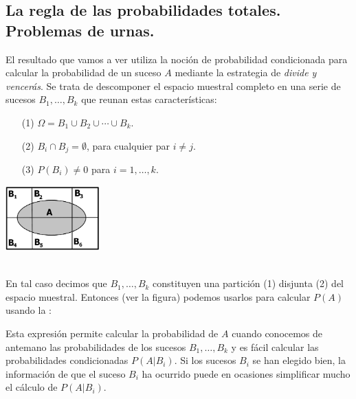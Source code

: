 \subsection{La regla de las probabilidades totales. Problemas de urnas.}
\label{cap03:subsec:ProbabilidadesTotales}


El resultado que vamos a ver utiliza la noción de probabilidad condicionada para calcular la probabilidad de un suceso $A$ mediante la estrategia de {\em divide y vencerás}.  Se trata de descomponer el espacio muestral completo en una serie de sucesos $B_1,\ldots,B_k$ que reunan estas características:\\[3mm]
\begin{minipage}{6.5cm}
    \begin{enumerate}
    	\item[(1)] $\Omega=B_1\cup B_2\cup\cdots\cup B_k.$
    	\item[(2)] $B_i\cap B_j=\emptyset$, para cualquier par $i\neq j$.
    	\item[(3)] $P(B_i)\neq 0$ para $i=1,\ldots,k$.
    \end{enumerate}
\end{minipage}
\begin{minipage}{6.5cm}
	\qquad\includegraphics[height=2.5cm]{../fig/Cap03-ProbabilidadesTotales.png}
\end{minipage}
\\[3mm]	
{En tal caso decimos que $B_1,\ldots,B_k$ constituyen una partici\'on (1) disjunta (2) del espacio muestral. } Entonces (ver la figura) podemos usarlos para calcular $P(A)$ usando la :
        \begin{center}
        \end{center}
Esta expresión permite calcular la probabilidad de $A$ cuando conocemos de antemano las probabilidades de los sucesos $B_1,\ldots,B_k$ y es fácil calcular las probabilidades condicionadas $P(A|B_i)$. Si los sucesos $B_i$ se han elegido bien, la información de que el suceso $B_i$ ha ocurrido puede en ocasiones simplificar mucho el cálculo de $P(A|B_i)$.

